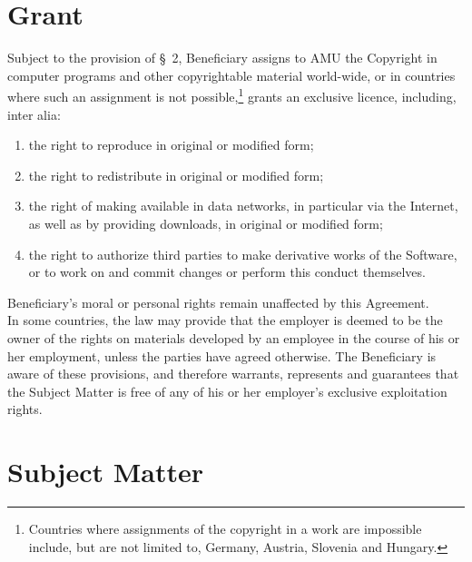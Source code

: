 \section{Grant}
\A Subject to the provision of {\S}~2, Beneficiary assigns to AMU the
Copyright in computer programs and other copyrightable material
world-wide, or in countries where such an assignment is not
possible,\footnote{Countries where assignments of the copyright in a
work are impossible include, but are not limited to, Germany, Austria,
Slovenia and Hungary.} grants an exclusive licence, including, inter
alia:
\begin{enumerate}
\item the right to reproduce in original or modified form;
\item the right to redistribute in original or modified form;
\item the right of making available in data networks, in particular
  via the Internet, as well as by providing downloads, in original or
  modified form;
\item the right to authorize third parties to make derivative works of
  the Software, or to work on and commit changes or perform this
  conduct themselves.
\end{enumerate}
\A Beneficiary's moral or personal rights remain unaffected by this
Agreement.\\ 
\A In some countries, the law may provide that the employer is deemed
to be the owner of the rights on materials developed by an employee in
the course of his or her employment, unless the parties have agreed
otherwise. The Beneficiary is aware of these provisions, and therefore
warrants, represents and guarantees that the Subject Matter is free of
any of his or her employer's exclusive exploitation rights.

\section{Subject Matter}

